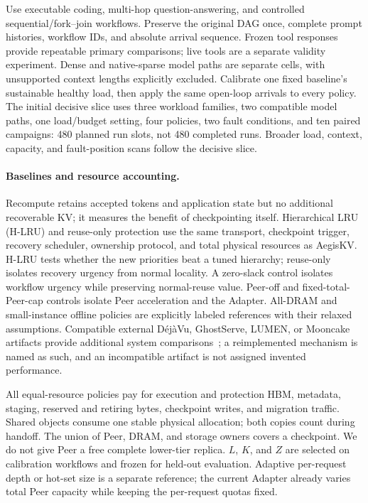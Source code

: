 Use executable coding, multi-hop question-answering, and controlled
sequential/fork--join workflows. Preserve the original DAG once, complete
prompt histories, workflow IDs, and absolute arrival sequence. Frozen
tool responses provide repeatable primary comparisons; live tools are
a separate validity experiment. Dense and native-sparse model paths are
separate cells, with unsupported context lengths explicitly excluded.
Calibrate one fixed baseline's sustainable healthy load, then apply the
same open-loop arrivals to every policy. The initial decisive slice uses
three workload families, two compatible model paths, one load/budget
setting, four policies, two fault conditions, and ten paired campaigns:
480 planned run slots, not 480 completed runs. Broader load, context,
capacity, and fault-position scans follow the decisive slice.

\paragraph{Baselines and resource accounting.}
Recompute retains accepted tokens and application state but no additional
recoverable KV; it measures the benefit of checkpointing itself.
Hierarchical LRU (H-LRU) and reuse-only protection use the same transport,
checkpoint trigger, recovery scheduler, ownership protocol, and total
physical resources as AegisKV. H-LRU tests whether the new priorities beat
a tuned hierarchy; reuse-only isolates recovery urgency from normal
locality. A zero-slack control isolates workflow urgency while preserving
normal-reuse value. Peer-off and fixed-total-Peer-cap controls isolate
Peer acceleration and the Adapter.
All-DRAM and small-instance offline policies are explicitly labeled
references with their relaxed assumptions. Compatible external
D\'ej\`aVu, GhostServe, LUMEN, or Mooncake artifacts provide additional
system comparisons~\cite{strati2024dejavu,jayakody2026ghostserve,cao2026lumen,qin2025mooncake};
a reimplemented mechanism is named as such, and an incompatible artifact
is not assigned invented performance.

All equal-resource policies pay for execution and protection HBM,
metadata, staging, reserved and retiring bytes, checkpoint writes, and
migration traffic. Shared objects consume one stable physical allocation;
both copies count during handoff. The union of Peer, DRAM, and storage
owners covers a checkpoint. We do not give Peer a free complete lower-tier
replica. $L$, $K$, and $Z$ are selected on calibration workflows and frozen
for held-out evaluation. Adaptive per-request depth or hot-set size is
a separate reference; the current Adapter already varies total Peer
capacity while keeping the per-request quotas fixed.

